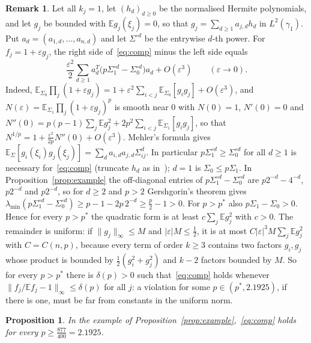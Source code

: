 \documentclass[11pt]{amsart}
\newtheorem{proposition}[theorem]{Proposition}
\theoremstyle{definition}
\newtheorem{remark}[theorem]{Remark}
\newcommand{\E}{\mathbb{E}}
\begin{document}
\begin{remark}\label{rem:second}
Let all $k_j=1$, let $(h_d)_{d\ge0}$ be the normalised Hermite polynomials, and let $g_j$ be bounded with
$\E g_j(\xi_j)=0$, so that $g_j=\sum_{d\ge1}a_{j,d}h_d$ in $L^2(\gamma_1)$. Put $a_d=(a_{1,d},\dots,a_{n,d})$ and let
$\Sigma^{\circ d}$ be the entrywise $d$-th power. For $f_j=1+\varepsilon g_j$, the right side of~\eqref{eq:comp} minus
the left side equals
\[
\frac{\varepsilon^2}2\sum_{d\ge1}a_d^T\big(p\Sigma_1^{\circ d}-\Sigma_0^{\circ d}\big)a_d+O(\varepsilon^3)
\qquad(\varepsilon\to0).
\]
Indeed, $\E_{\Sigma_0}\prod_j(1+\varepsilon g_j)=1+\varepsilon^2\sum_{i<j}\E_{\Sigma_0}[g_ig_j]+O(\varepsilon^3)$, and
$N(\varepsilon)=\E_{\Sigma_1}\prod_j(1+\varepsilon g_j)^p$ is smooth near $0$ with $N(0)=1$, $N'(0)=0$ and
$N''(0)=p(p-1)\sum_j\E g_j^2+2p^2\sum_{i<j}\E_{\Sigma_1}[g_ig_j]$, so that
$N^{1/p}=1+\frac{\varepsilon^2}{2p}N''(0)+O(\varepsilon^3)$. Mehler's formula gives
$\E_\Sigma[g_i(\xi_i)g_j(\xi_j)]=\sum_da_{i,d}a_{j,d}\Sigma_{ij}^d$. In particular $p\Sigma_1^{\circ d}\ge\Sigma_0^{\circ d}$
for all $d\ge1$ is necessary for~\eqref{eq:comp} (truncate $h_d$ as in~\cite[Prop.~6.2]{FR}); $d=1$ is
$\Sigma_0\le p\Sigma_1$. In Proposition~\ref{prop:example} the off-diagonal entries of $p\Sigma_1^{\circ d}-\Sigma_0^{\circ d}$
are $p2^{-d}-4^{-d}$, $p2^{-d}$ and $p2^{-d}$, so for $d\ge2$ and $p>2$ Gershgorin's theorem gives
$\lambda_{\min}(p\Sigma_1^{\circ d}-\Sigma_0^{\circ d})\ge p-1-2p\,2^{-d}\ge\frac p2-1>0$. For $p>p^*$ also
$p\Sigma_1-\Sigma_0>0$. Hence for every $p>p^*$ the quadratic form is at least $c\sum_j\E g_j^2$ with $c>0$. The remainder is uniform:
if $\|g_j\|_\infty\le M$ and $|\varepsilon|M\le\frac12$, it is at most $C|\varepsilon|^3M\sum_j\E g_j^2$ with
$C=C(n,p)$, because every term of order $k\ge3$ contains two factors $g_i,g_j$ whose product is bounded by
$\frac12(g_i^2+g_j^2)$ and $k-2$ factors bounded by $M$. So for every $p>p^*$ there is $\delta(p)>0$ such
that~\eqref{eq:comp} holds whenever $\|f_j/\E f_j-1\|_\infty\le\delta(p)$ for all $j$: a violation for some
$p\in(p^*,2.1925)$, if there is one, must be far from constants in the uniform norm.
\end{remark}

\begin{proposition}\label{prop:certificate}
In the example of Proposition~\ref{prop:example},~\eqref{eq:comp} holds for every $p\ge\frac{877}{400}=2.1925$.
\end{proposition}
\end{document}

